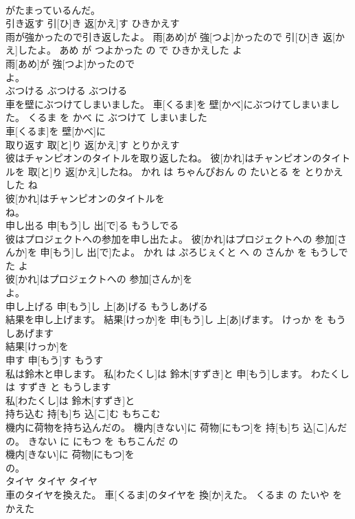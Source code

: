 \documentclass[8pt]{extreport}
\begin{document}
\begin{CJK}{UTF8}{min}
\\	がたまっているんだ。			
\\	引き返す	引[ひ]き 返[かえ]す	ひきかえす	
\\	雨が強かったので引き返したよ。	雨[あめ]が 強[つよ]かったので 引[ひ]き 返[かえ]したよ。	あめ が つよかった の で ひきかえした よ	
\\	雨[あめ]が 強[つよ]かったので
\\	よ。			
\\	ぶつける	ぶつける	ぶつける	
\\	車を壁にぶつけてしまいました。	車[くるま]を 壁[かべ]にぶつけてしまいました。	くるま を かべ に ぶつけて しまいました	
\\	車[くるま]を 壁[かべ]に
\\	取り返す	取[と]り 返[かえ]す	とりかえす	
\\	彼はチャンピオンのタイトルを取り返したね。	彼[かれ]はチャンピオンのタイトルを 取[と]り 返[かえ]したね。	かれ は ちゃんぴおん の たいとる を とりかえした ね	
\\	彼[かれ]はチャンピオンのタイトルを
\\	ね。			
\\	申し出る	申[もう]し 出[で]る	もうしでる	
\\	彼はプロジェクトへの参加を申し出たよ。	彼[かれ]はプロジェクトへの 参加[さんか]を 申[もう]し 出[で]たよ。	かれ は ぷろじぇくと へ の さんか を もうしでた よ	
\\	彼[かれ]はプロジェクトへの 参加[さんか]を
\\	よ。			
\\	申し上げる	申[もう]し 上[あ]げる	もうしあげる	
\\	結果を申し上げます。	結果[けっか]を 申[もう]し 上[あ]げます。	けっか を もうしあげます	
\\	結果[けっか]を
\\	申す	申[もう]す	もうす	
\\	私は鈴木と申します。	私[わたくし]は 鈴木[すずき]と 申[もう]します。	わたくし は すずき と もうします	
\\	私[わたくし]は 鈴木[すずき]と
\\	持ち込む	持[も]ち 込[こ]む	もちこむ	
\\	機内に荷物を持ち込んだの。	機内[きない]に 荷物[にもつ]を 持[も]ち 込[こ]んだの。	きない に にもつ を もちこんだ の	
\\	機内[きない]に 荷物[にもつ]を
\\	の。			
\\	タイヤ	タイヤ	タイヤ	
\\	車のタイヤを換えた。	車[くるま]のタイヤを 換[か]えた。	くるま の たいや を かえた	

\end{CJK}
\end{document}
